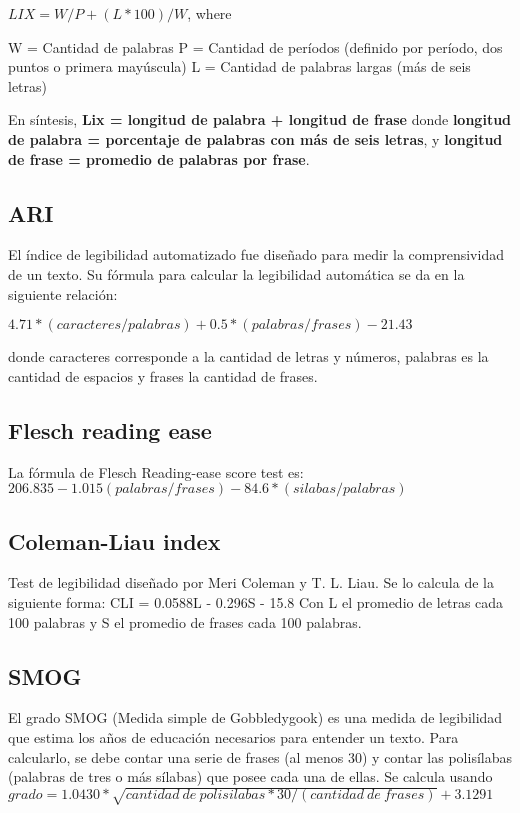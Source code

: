 \documentclass[12pt,journal,compsoc]{IEEEtran}
\begin{document}
$LIX = W/P + (L * 100)/W$, where

W = Cantidad de palabras 
P = Cantidad de períodos (definido por período, dos puntos o primera mayúscula)
L = Cantidad de palabras largas (más de seis letras)

En síntesis, \textbf{Lix = longitud de palabra + longitud de frase} donde \textbf{longitud de palabra = porcentaje de palabras con más de seis letras}, y \textbf{longitud de frase = promedio de palabras por frase}.


\subsection{ARI}
El índice de legibilidad automatizado fue diseñado para medir la comprensividad de un texto. Su fórmula para calcular la legibilidad automática se da en la siguiente relación:

$4.71 * (caracteres/palabras)+0.5*(palabras/frases) - 21.43$

donde caracteres corresponde a la cantidad de letras y números, palabras es la cantidad de espacios y frases la cantidad de frases.

\subsection{Flesch reading ease}

La fórmula de Flesch Reading-ease score test es:
$206.835 - 1.015(palabras/frases) - 84.6*(silabas/palabras)$

\subsection{Coleman-Liau index}
Test de legibilidad diseñado por Meri Coleman y T. L. Liau. Se lo calcula de la siguiente forma: CLI = 0.0588L - 0.296S - 15.8
Con L el promedio de letras cada 100 palabras y S el promedio de frases cada 100 palabras.

\subsection{SMOG}
El grado SMOG (Medida simple de Gobbledygook) es una medida de legibilidad que estima los años de educación necesarios para entender un texto. Para calcularlo, se debe contar una serie de frases (al menos 30) y contar las polisílabas (palabras de tres o más sílabas) que posee cada una de ellas. Se calcula usando \textbf{$grado = 1.0430*\sqrt{cantidad\ de\ polisilabas * 30/(cantidad\ de\ frases)} + 3.1291$}
\end{document}
